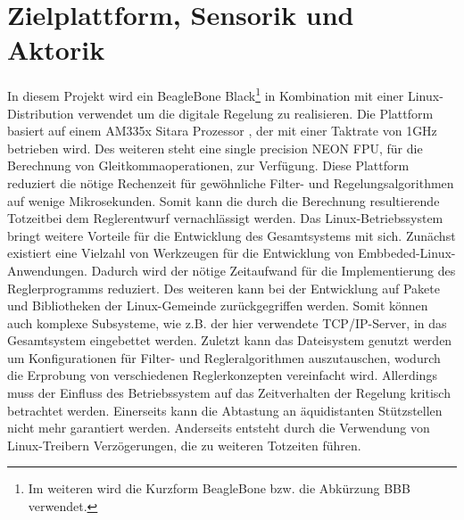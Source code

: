 \section{Zielplattform, Sensorik und Aktorik}
In diesem Projekt wird ein BeagleBone Black\footnote{Im weiteren wird die Kurzform BeagleBone bzw. die Abkürzung BBB verwendet.} \cite{BBBSRM} in Kombination mit einer Linux-Distribution verwendet um die digitale Regelung zu realisieren. Die Plattform basiert auf einem AM335x Sitara  Prozessor \cite{AM335x}, der mit einer Taktrate von 1GHz betrieben wird. Des weiteren steht eine single precision NEON FPU, für die Berechnung von Gleitkommaoperationen, zur Verfügung. Diese Plattform reduziert die nötige Rechenzeit für gewöhnliche Filter- und Regelungsalgorithmen auf wenige Mikrosekunden. Somit kann die durch die Berechnung resultierende Totzeitbei dem Reglerentwurf vernachlässigt werden.
Das Linux-Betriebssystem bringt weitere Vorteile für die Entwicklung des Gesamtsystems mit sich. Zunächst existiert eine Vielzahl von Werkzeugen für die Entwicklung von Embbeded-Linux-Anwendungen. Dadurch wird der nötige Zeitaufwand für die Implementierung des Reglerprogramms reduziert. Des weiteren kann bei der Entwicklung auf Pakete und Bibliotheken der Linux-Gemeinde zurückgegriffen werden. Somit können auch komplexe Subsysteme, wie z.B. der hier verwendete TCP/IP-Server, in das Gesamtsystem eingebettet werden. Zuletzt kann das Dateisystem genutzt werden um Konfigurationen für Filter- und Regleralgorithmen auszutauschen, wodurch die Erprobung von verschiedenen Reglerkonzepten vereinfacht wird. 
Allerdings muss der Einfluss des Betriebssystem auf das Zeitverhalten der Regelung kritisch betrachtet werden. Einerseits kann die Abtastung an äquidistanten Stützstellen nicht mehr garantiert werden. Anderseits entsteht durch die Verwendung von Linux-Treibern Verzögerungen, die zu weiteren Totzeiten führen.

